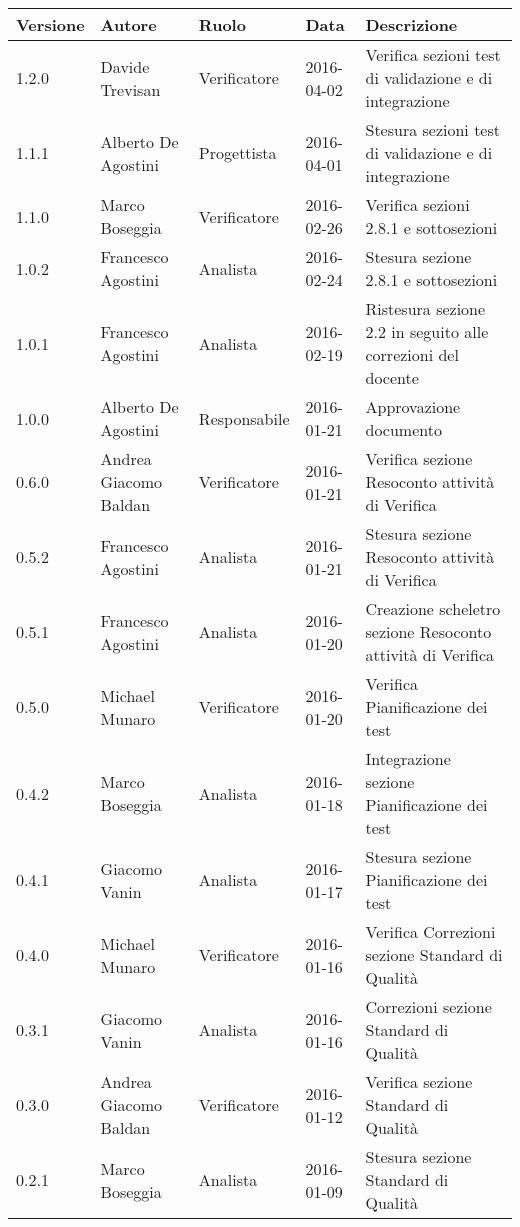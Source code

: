 \documentclass{scalatekids-article}
\begin{document}
\begin{center}
  \begin{tabular}{| l | l | l | l | p{5cm} |}
    \hline
    Versione & Autore & Ruolo & Data & Descrizione \\
    \hline
    1.2.0 & Davide Trevisan & Verificatore & 2016-04-02 & Verifica sezioni test di validazione e di integrazione\\
    \hline
    1.1.1 & Alberto De Agostini & Progettista & 2016-04-01 & Stesura sezioni test di validazione e di integrazione\\
    \hline
    1.1.0 & Marco Boseggia & Verificatore & 2016-02-26 & Verifica sezioni 2.8.1 e sottosezioni\\
    \hline
    1.0.2 & Francesco Agostini & Analista & 2016-02-24 & Stesura sezione 2.8.1 e sottosezioni\\
    \hline
    1.0.1 & Francesco Agostini & Analista & 2016-02-19 & Ristesura sezione 2.2 in seguito alle correzioni del docente\\
    \hline
    1.0.0 & Alberto De Agostini & Responsabile & 2016-01-21 & Approvazione documento\\
    \hline
    0.6.0 & Andrea Giacomo Baldan & Verificatore & 2016-01-21 & Verifica sezione Resoconto attività di Verifica\\
    \hline
    0.5.2 & Francesco Agostini & Analista & 2016-01-21 & Stesura sezione Resoconto attività di Verifica\\
    \hline
    0.5.1 & Francesco Agostini & Analista & 2016-01-20 & Creazione scheletro sezione Resoconto attività di Verifica\\
    \hline
    0.5.0 & Michael Munaro & Verificatore & 2016-01-20 & Verifica Pianificazione dei test\\
    \hline
    0.4.2 & Marco Boseggia & Analista & 2016-01-18 & Integrazione sezione Pianificazione dei test\\
    \hline
    0.4.1 & Giacomo Vanin & Analista & 2016-01-17 & Stesura sezione Pianificazione dei test\\
    \hline
    0.4.0 & Michael Munaro & Verificatore & 2016-01-16 & Verifica Correzioni sezione Standard di Qualità\\
    \hline
    0.3.1 & Giacomo Vanin & Analista & 2016-01-16 & Correzioni sezione Standard di Qualità\\
    \hline
    0.3.0 & Andrea Giacomo Baldan & Verificatore & 2016-01-12 & Verifica sezione Standard di Qualità\\
    \hline
    0.2.1 & Marco Boseggia & Analista & 2016-01-09 & Stesura sezione Standard di Qualità\\

\end{tabular}
\end{center}
\end{document}

